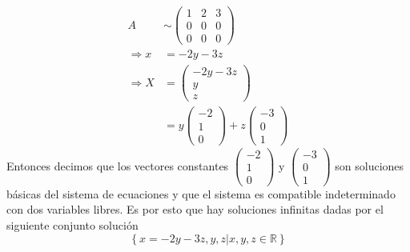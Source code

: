 \documentclass[12pt, letterpaper]{article}
\begin{document}
\begin{enumerate}
    \begin{equation*}
        \begin{aligned}
            A
            & \sim
            \begin{pmatrix}
                1 & 2 & 3 \\
                0 & 0 & 0 \\
                0 & 0 & 0
            \end{pmatrix} \\
            \Rightarrow x
            & = -2y-3z \\
            \Rightarrow X
            & =
            \begin{pmatrix}
                -2y-3z \\
                y \\
                z
            \end{pmatrix} \\
            & = y
            \begin{pmatrix}
                -2 \\
                1 \\
                0
            \end{pmatrix}
            + z
            \begin{pmatrix}
                -3 \\
                0 \\
                1
            \end{pmatrix}
        \end{aligned}
    \end{equation*}
    Entonces decimos que los vectores constantes
    $\begin{pmatrix}
        -2 \\
        1 \\
        0
    \end{pmatrix}$ y
    $\begin{pmatrix}
        -3 \\
        0 \\
        1
    \end{pmatrix}$
    son soluciones básicas del sistema de ecuaciones y que el sistema es compatible indeterminado con dos variables libres. Es por esto que hay soluciones infinitas dadas por el siguiente conjunto solución
    \begin{equation*}
        \left\{ 
            x = -2y-3z, y, z | x,y,z \in \mathbb{R} 
        \right\}
    \end{equation*}
\end{enumerate}
\end{document}
